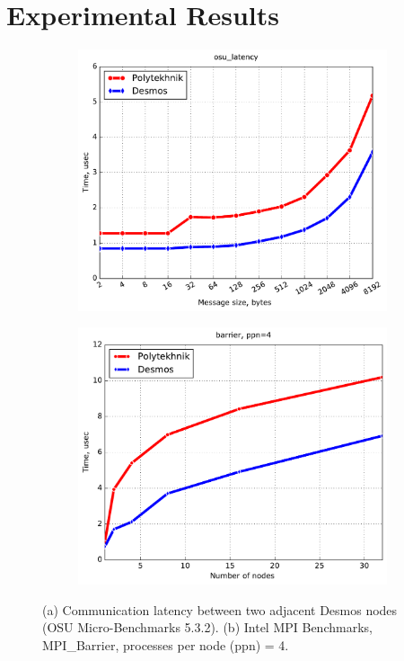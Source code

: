 \documentclass{llncs}
\begin{document}
\section{Experimental Results}

\begin{figure}[h!]
\centering
   \begin{subfigure}{0.48\textwidth}
  \includegraphics[width=1\textwidth]{img/osu_latency.pdf}\caption{}
  \end{subfigure}
  \begin{subfigure}{0.48\textwidth}
  \includegraphics[width=1\textwidth]{img/barrier_ppn4.pdf}\caption{}
   \end{subfigure}
\caption{(a) Communication latency between two adjacent Desmos nodes (OSU Micro-Benchmarks 5.3.2). (b) Intel MPI Benchmarks, MPI\_Barrier, processes per node (ppn) = 4.}
\end{figure}
\end{document}

